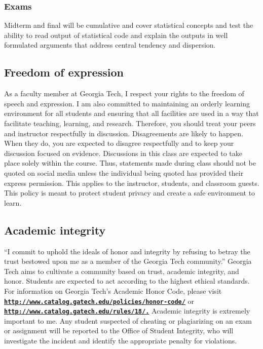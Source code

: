 \documentclass[11pt]{article}
\begin{document}
\subsubsection*{Exams}
Midterm and final will be cumulative and cover statistical concepts and test the ability to read output of statistical code and explain the outputs in well formulated arguments that address central tendency and dispersion.



\subsection*{Freedom of expression}
As   a   faculty   member   at   Georgia   Tech,   I   respect   your   rights   to   the   freedom   of   speech   and
expression.  I am also committed to maintaining an orderly learning environment for all students
and ensuring that all facilities are used in a way that facilitate teaching, learning, and research.
Therefore, you should treat your peers and instructor respectfully in discussion.  Disagreements
are likely to happen. When they do, you are expected to disagree respectfully and to keep your
discussion focused on evidence.
Discussions in this class are expected to take place solely within the course.   Thus, statements
made during class should not be quoted on social media unless the individual being quoted has
provided their express permission.  This applies to the instructor, students, and classroom guests.
This policy is meant to protect student privacy and create a safe environment to learn.
\subsection*{Academic integrity}
“I commit to uphold the ideals of honor and integrity by refusing to betray the trust bestowed
upon me as a member of the Georgia Tech community.”
Georgia   Tech   aims   to   cultivate   a   community   based   on   trust,   academic   integrity,   and   honor.
Students   are   expected   to   act   according   to   the   highest   ethical   standards.     For   information   on
Georgia   Tech's   Academic   Honor   Code,   please   visit
\href{http://www.catalog.gatech.edu/policies/honor-code/}{\tt\bf http://www.catalog.gatech.edu/policies/honor-code/}  or 
\href{http://www.catalog.gatech.edu/rules/18/.}{\tt\bf http://www.catalog.gatech.edu/rules/18/.} 
Academic integrity is extremely important to me.
Any student suspected of cheating or plagiarizing on an exam or assignment will be reported to
the Office of Student Integrity, who will investigate the incident and identify the appropriate
penalty for violations.
\end{document}
